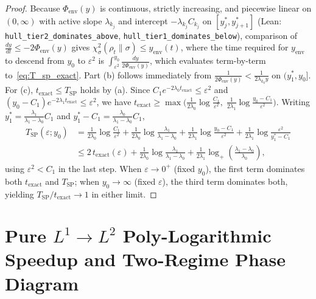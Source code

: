 \documentclass[11pt,a4paper]{article}
\theoremstyle{definition}
\begin{document}
\begin{proof}
Because $\Phi_{\mathrm{env}}(y)$ is continuous, strictly increasing, and piecewise linear on $(0, \infty)$ with active slope $\lambda_{k_j}$ and intercept $-\lambda_{k_j} C_{k_j}$ on $[y_j^*, y_{j+1}^*]$ (Lean: \texttt{hull\_tier2\_dominates\_above}, \texttt{hull\_tier1\_dominates\_below}), comparison of $\frac{dy}{dt} \le -2\Phi_{\mathrm{env}}(y)$ gives $\chi^2_\sigma(\rho_t\|\sigma) \le y_{\mathrm{env}}(t)$, where the time required for $y_{\mathrm{env}}$ to descend from $y_0$ to $\varepsilon^2$ is $\int_{\varepsilon^2}^{y_0} \frac{dy}{2\Phi_{\mathrm{env}}(y)}$, which evaluates term-by-term to~\eqref{eq:T_sp_exact}. Part (b) follows immediately from $\frac{1}{2\Phi_{\mathrm{env}}(y)} < \frac{1}{2\lambda_{k_0} y}$ on $(y_1^*, y_0]$. For (c), $t_{\mathrm{exact}} \le T_{\mathrm{SP}}$ holds by (a). Since $C_1 e^{-2\lambda_0 t_{\mathrm{exact}}} \le \varepsilon^2$ and $(y_0 - C_1) e^{-2\lambda_1 t_{\mathrm{exact}}} \le \varepsilon^2$, we have $t_{\mathrm{exact}} \ge \max\bigl(\frac{1}{2\lambda_0}\log\frac{C_1}{\varepsilon^2},\; \frac{1}{2\lambda_1}\log\frac{y_0 - C_1}{\varepsilon^2}\bigr)$. Writing $y_1^* = \frac{\lambda_1}{\lambda_1 - \lambda_0} C_1$ and $y_1^* - C_1 = \frac{\lambda_0}{\lambda_1 - \lambda_0} C_1$,
\begin{align*}
  T_{\mathrm{SP}}(\varepsilon; y_0)
  &= \frac{1}{2\lambda_0}\log\frac{C_1}{\varepsilon^2} + \frac{1}{2\lambda_0}\log\frac{\lambda_1}{\lambda_1 - \lambda_0}
   + \frac{1}{2\lambda_1}\log\frac{y_0 - C_1}{\varepsilon^2} + \frac{1}{2\lambda_1}\log\frac{\varepsilon^2}{y_1^* - C_1} \\
  &\le 2\,t_{\mathrm{exact}}(\varepsilon) + \frac{1}{2\lambda_0}\log\frac{\lambda_1}{\lambda_1 - \lambda_0} + \frac{1}{2\lambda_1}\log_+\!\left(\frac{\lambda_1 - \lambda_0}{\lambda_0}\right),
\end{align*}
using $\varepsilon^2 < C_1$ in the last step. When $\varepsilon \to 0^+$ (fixed $y_0$), the first term dominates both $t_{\mathrm{exact}}$ and $T_{\mathrm{SP}}$; when $y_0 \to \infty$ (fixed $\varepsilon$), the third term dominates both, yielding $T_{\mathrm{SP}}/t_{\mathrm{exact}} \to 1$ in either limit.
\end{proof}

\section{Pure \texorpdfstring{$L^1 \to L^2$}{L1 -> L2} Poly-Logarithmic Speedup and Two-Regime Phase Diagram}
\label{sec:scaling}
\end{document}
